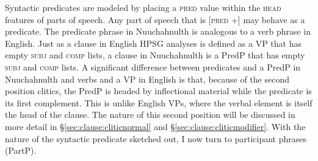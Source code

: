 \ex \label{ex:nounpredtree}
\xe

Syntactic predicates are modeled by placing a \textsc{pred} value within the \textsc{head} features of parts of speech. Any part of speech that is [\textsc{pred} +] may behave as a predicate. The predicate phrase in Nuuchahnulth is analogous to a verb phrase in English. Just as a clause in English HPSG analyses is defined as a VP that has empty \textsc{subj} and \textsc{comp} lists, a clause in Nuuchahnulth is a PredP that has empty \textsc{subj} and \textsc{comp} lists. A significant difference between predicates and a PredP in Nuuchahnulth and verbs and a VP in English is that, because of the second position clitics, the PredP is headed by inflectional material while the predicate is its first complement. This is unlike English VPs, where the verbal element is itself the head of the clause. The nature of this second position will be discussed in more detail in \S\ref{sec:clause:cliticnormal} and \S\ref{sec:clause:cliticmodifier}. With the nature of the syntactic predicate sketched out, I now turn to participant phrases (PartP).


